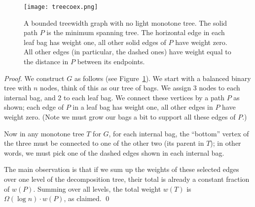 \documentclass{llncs}
\begin{document}
\begin{figure}[ht]
\begin{center}
{\texttt{[image: treecoex.png]}}
\caption{A bounded treewidth graph with no light monotone tree. 
The solid path $P$ is the minimum spanning tree. The horizontal edge
in each leaf bag has weight one, all other solid edges of $P$ have
weight zero.  All other edges (in particular, the dashed ones) have
weight equal to the distance in $P$ between its endpoints.}
\label{fig:treeex}
\end{center}
\end{figure}
\begin{proof}
We construct $G$ as follows (see Figure~\ref{fig:treeex}).   We start
with a balanced binary tree with $n$ nodes, think of this as our tree
of bags.  We assign 3 nodes to each internal bag, and 2 to each leaf bag.  
We connect these vertices by a path $P$ as shown; each edge of $P$ in a leaf
bag has weight one, all other edges in $P$ have weight zero.  (Note 
we must grow our bags a bit to support all these edges of $P$.)

Now in any monotone tree $T$ for $G$, for each internal bag, the
``bottom'' vertex of the three must be connected to one of the
other two (its parent in $T$); in other words, we must pick one of the
dashed edges shown in each internal bag.

The main observation is that if we sum up the weights of these
selected edges over one level of the decomposition tree, their total
is already a constant fraction of $w(P)$.  Summing over all levels,
the total weight $w(T)$ is $\Omega(\log n)\cdot w(P)$, as claimed.
\qed
\end{proof}






\end{document}
